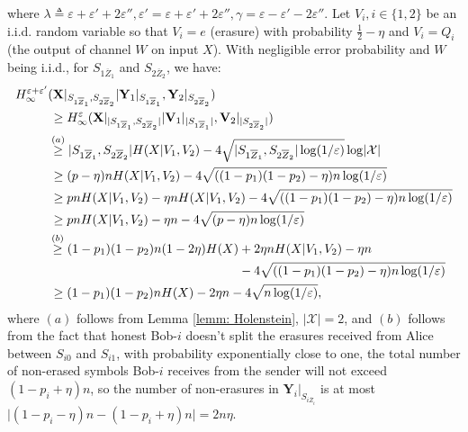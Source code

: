 \documentclass[runningheads]{llncs}
\begin{document}
where $\lambda\triangleq \varepsilon + \varepsilon' + 2\varepsilon'', \varepsilon' = \varepsilon + \varepsilon' + 2\varepsilon'', \gamma = \varepsilon - \varepsilon' - 2\varepsilon''$. Let $V_i, i\in\{1,2\}$ be an i.i.d. random variable so that $V_i = e$ (erasure) with probability $\frac12-\eta$ and $V_i = Q_i$ (the output of channel $W$ on input $X$). With negligible error probability and $W$ being i.i.d., for $S_{1\overline{Z}_1}$ and $S_{2\overline{Z}_2}$, we have:
\begin{align}\label{eq: middle+1}
    H_\infty^{\varepsilon+\varepsilon'}&(\mathbf{X}|_{ S_{1\overline{Z}_1},S_{2\overline{Z}_2}}|\mathbf{Y}_1|_{S_{1\overline{Z}_1}},\mathbf{Y}_2|_{S_{2\overline{Z}_2}})\notag\\
    &\,\geq H_\infty^{\varepsilon}(\mathbf{X}|_{\lvert S_{1\overline{Z}_1},S_{2\overline{Z}_2}\lvert}|\mathbf{V}_1|_{\lvert S_{1\overline{Z}_1}\lvert},\mathbf{V}_2|_{\lvert S_{2\overline{Z}_2}\lvert})\notag\\
    & \overset{(a)}{\geq} \lvert S_{1\overline{Z}_1},S_{2\overline{Z}_2}\rvert H(X|V_1,V_2)-4\sqrt{\lvert S_{1\overline{Z}_1},S_{2\overline{Z}_2}\rvert\log(1/\varepsilon)}\log \lvert \mathcal{X} \rvert\notag\\
    & \,\geq (p-\eta)n H(X|V_1,V_2)-4\sqrt{((1-p_1)(1-p_2)-\eta)n\log(1/\varepsilon)}\notag\notag\\
    & \,\geq pn H(X|V_1,V_2)-\eta n H(X|V_1,V_2)-4\sqrt{((1-p_1)(1-p_2)-\eta)n\log(1/\varepsilon)}\notag\notag\\
    & \,\geq pn H(X|V_1,V_2)-\eta n -4\sqrt{(p-\eta)n\log(1/\varepsilon)}\notag\notag\\
    & \overset{(b)}{\geq} (1-p_1)(1-p_2)n (1-2\eta)H(X)+2\eta n H(X|V_1,V_2)-\eta n\notag\\
    & \qquad\qquad\qquad\qquad\qquad\qquad\qquad\quad\,-4\sqrt{((1-p_1)(1-p_2)-\eta)n\log(1/\varepsilon)}\notag\notag\\
    & \,\geq (1-p_1)(1-p_2)n H(X)-2\eta n-4\sqrt{n\log(1/\varepsilon)},
\end{align}
where $(a)$ follows from Lemma \ref{lemm: Holenstein}, $\lvert\mathcal{X}\rvert = 2$, and $(b)$ follows from the fact that honest Bob-$i$ doesn't split the erasures received from Alice between $S_{i0}$ and $S_{i1}$, with probability exponentially close to one, the total number of non-erased symbols Bob-$i$ receives from the sender will not exceed $(1-p_i + \eta)n$, so the number of non-erasures in $\mathbf{Y}_i|_{S_{i\overline{Z}_i}}$ is at most $\lvert(1-p_i-\eta)n - (1-p_i + \eta)n\rvert = 2n\eta$.
\end{document}

